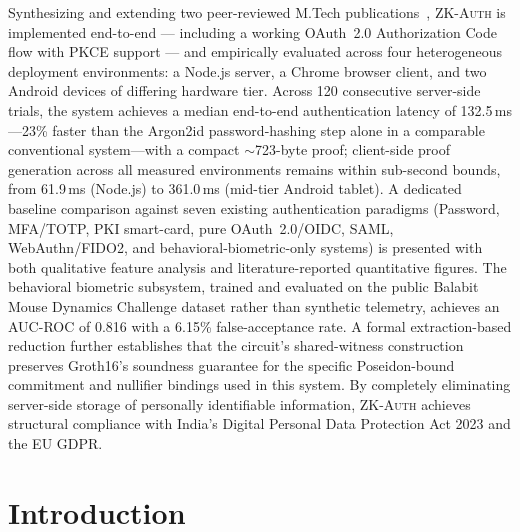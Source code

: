 \documentclass[12pt,a4paper,oneside]{report}
\begin{document}
Synthesizing and extending two peer-reviewed M.Tech
publications~\cite{dandge2025zkpcloud,prasad2025abereview}, \textsc{ZK-Auth}
is implemented end-to-end --- including a working OAuth~2.0 Authorization
Code flow with PKCE support --- and empirically evaluated across four
heterogeneous deployment environments: a Node.js server, a Chrome browser
client, and two Android devices of differing hardware tier. Across 120
consecutive server-side trials, the system achieves a median end-to-end
authentication latency of 132.5\,ms---23\% faster than the Argon2id
password-hashing step alone in a comparable conventional system---with a
compact $\sim$723-byte proof; client-side proof generation across all
measured environments remains within sub-second bounds, from 61.9\,ms
(Node.js) to 361.0\,ms (mid-tier Android tablet). A dedicated baseline
comparison against seven existing authentication paradigms (Password,
MFA/TOTP, PKI smart-card, pure OAuth~2.0/OIDC, SAML, WebAuthn/FIDO2, and
behavioral-biometric-only systems) is presented with both qualitative
feature analysis and literature-reported quantitative figures. The
behavioral biometric subsystem, trained and evaluated on the public
Balabit Mouse Dynamics Challenge dataset rather than synthetic telemetry,
achieves an AUC-ROC of 0.816 with a 6.15\% false-acceptance rate. A formal
extraction-based reduction further establishes that the circuit's
shared-witness construction preserves Groth16's soundness guarantee for
the specific Poseidon-bound commitment and nullifier bindings used in this
system. By completely eliminating server-side storage of personally
identifiable information, \textsc{ZK-Auth} achieves structural compliance
with India's Digital Personal Data Protection Act 2023 and the EU GDPR.

\clearpage
\tableofcontents

\clearpage
\listoftables
{}

\clearpage
\listoffigures
{}

\clearpage
{}
\setcounter{page}{1}

\chapter{Introduction}
\end{document}
